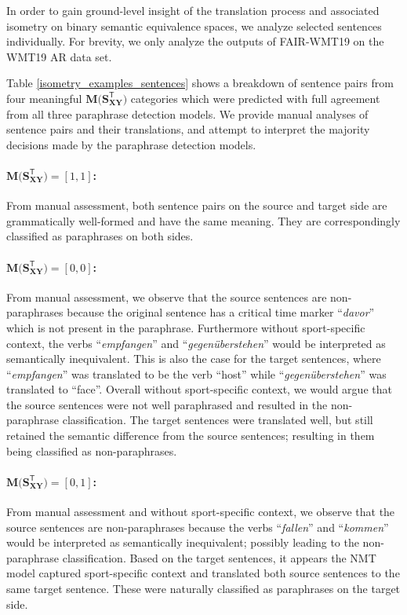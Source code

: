 \documentclass[11pt,a4paper]{article}
\begin{document}
In order to gain ground-level insight of the translation process and associated
isometry on binary semantic equivalence spaces, we analyze selected sentences
individually. For brevity, we only analyze the outputs of FAIR-WMT19 on the
WMT19 AR data set.

Table \ref{isometry_examples_sentences} shows a breakdown of sentence pairs from
four meaningful $\mathbf{M(S_{XY}^{\mathsf{T}}})$ categories which were
predicted with full agreement from all three paraphrase detection models. We
provide manual analyses of sentence pairs and their translations, and attempt to
interpret the majority decisions made by the paraphrase detection models.

\paragraph{$\mathbf{M(S_{XY}^{\mathsf{T}}}) = [1,1]$:} From manual assessment,
both sentence pairs on the source and target side are grammatically well-formed
and have the same meaning. They are correspondingly classified as paraphrases on
both sides.
\paragraph{$\mathbf{M(S_{XY}^{\mathsf{T}}}) = [0,0]$:} From manual assessment,
we observe that the source sentences are non-paraphrases because the original
sentence has a critical time marker ``\textit{davor}'' which is not present in
the paraphrase. Furthermore without sport-specific context, the verbs
``\textit{empfangen}'' and ``\textit{gegenüberstehen}'' would be interpreted as
semantically inequivalent. This is also the case for the target sentences, where
``\textit{empfangen}'' was translated to be the verb ``host'' while
``\textit{gegenüberstehen}'' was translated to ``face''. Overall without
sport-specific context, we would argue that the source sentences were not well
paraphrased and resulted in the non-paraphrase classification. The target
sentences were translated well, but still retained the semantic difference from
the source sentences; resulting in them being classified as non-paraphrases.
\paragraph{$\mathbf{M(S_{XY}^{\mathsf{T}}}) = [0,1]$:} From manual assessment
and without sport-specific context, we observe that the source sentences are
non-paraphrases because the verbs ``\textit{fallen}'' and ``\textit{kommen}''
would be interpreted as semantically inequivalent; possibly leading to the
non-paraphrase classification. Based on the target sentences, it appears the NMT
model captured sport-specific context and translated both source sentences to
the same target sentence. These were naturally classified as paraphrases on the
target side.
\end{document}
